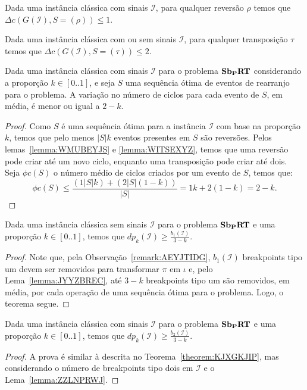 \begin{lemma}\label{lemma:WMUBEYJS}
Dada uma instância clássica com sinais $\mathcal{I}$, para qualquer reversão $\rho$ temos que $\Delta c(G(\mathcal{I}), S = (\rho)) \le 1$.
\end{lemma}

\begin{lemma}\label{lemma:WITSEXYZ}
Dada uma instância clássica com ou sem sinais $\mathcal{I}$, para qualquer transposição $\tau$ temos que $\Delta c(G(\mathcal{I}), S = (\tau)) \le 2$.
\end{lemma}

\begin{lemma}\label{lemma:IMSCPWKN}
Dada uma instância clássica com sinais $\mathcal{I}$ para o problema $\textbf{Sb\textsubscript{P}RT}{}$ considerando a proporção $k \in [0..1]$, e seja $S$ uma sequência ótima de eventos de rearranjo para o problema. A variação no número de ciclos para cada evento de $S$, em média, é menor ou igual a $2-k$.
\end{lemma}
\begin{proof}
Como $S$ é uma sequência ótima para a instância $\mathcal{I}$ com base na proporção $k$, temos que pelo menos $|S|k$ eventos presentes em $S$ são reversões. Pelos lemas~\ref{lemma:WMUBEYJS} e \ref{lemma:WITSEXYZ}, temos que uma reversão pode criar até um novo ciclo, enquanto uma transposição pode criar até dois. Seja $\phi c(S)$ o número médio de ciclos criados por um evento de $S$, temos que:
$$\phi c(S) \leq \frac{(1 |S| k) + (2 |S| (1 - k))}{|S|} = 1k + 2(1 - k) = 2 - k.$$
\end{proof}

\begin{theorem}\label{theorem:KJXGKJIP}
Dada uma instância clássica sem sinais $\mathcal{I}$ para o problema $\textbf{Sb\textsubscript{P}RT}{}$ e uma proporção $k \in [0..1]$, temos que $dp_{k}(\mathcal{I}) \ge \frac{b_1(\mathcal{I})}{3-k}$.
\end{theorem}
\begin{proof}
Note que, pela Observação~\ref{remark:AEYJTIDG}, $b_1(\mathcal{I})$ breakpoints tipo um devem ser removidos para transformar $\pi$ em $\iota$ e, pelo Lema~\ref{lemma:JYYZBREC}, até $3-k$ breakpoints tipo um são removidos, em média, por cada operação de uma sequência ótima para o problema. Logo, o teorema segue.
\end{proof}

\begin{theorem}\label{theorem:ABGZQHIL}
Dada uma instância clássica com sinais $\mathcal{I}$ para o problema $\textbf{Sb\textsubscript{P}RT}{}$ e uma proporção $k \in [0..1]$, temos que $dp_{k}(\mathcal{I}) \ge \frac{b_2(\mathcal{I})}{3-k}$.
\end{theorem}
\begin{proof}
A prova é similar à descrita no Teorema~\ref{theorem:KJXGKJIP}, mas considerando o número de breakpoints tipo dois em $\mathcal{I}$ e o Lema~\ref{lemma:ZZLNPRWJ}.
\end{proof}

